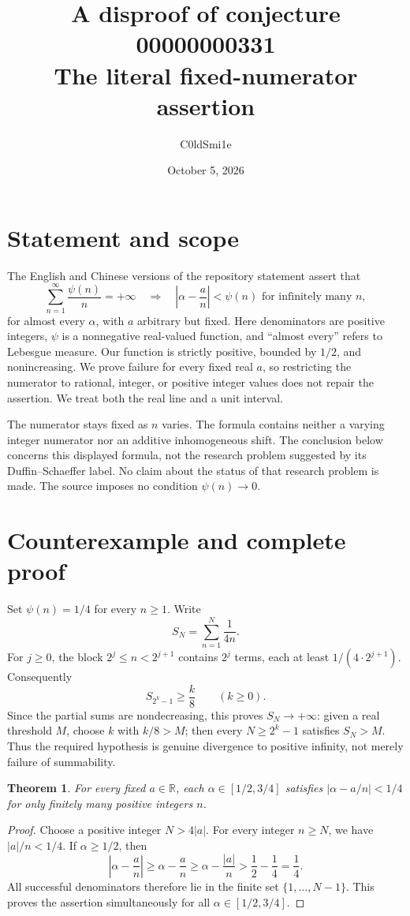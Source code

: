 \documentclass[11pt]{article}
\title{A disproof of conjecture 00000000331\\\large The literal fixed-numerator assertion}
\author{C0ldSmi1e}
\date{October 5, 2026}
\newtheorem{theorem}{Theorem}
\begin{document}
\maketitle

\section{Statement and scope}
The English and Chinese versions of the repository statement assert that
\[
 \sum_{n=1}^{\infty}\frac{\psi(n)}{n}=+\infty
 \quad\Longrightarrow\quad
 \left|\alpha-\frac{a}{n}\right|<\psi(n)
 \text{ for infinitely many }n,
\]
for almost every $\alpha$, with $a$ arbitrary but fixed. Here denominators
are positive integers, $\psi$ is a nonnegative real-valued function, and
``almost every'' refers to Lebesgue measure. Our function is strictly positive,
bounded by $1/2$, and nonincreasing. We prove failure for every fixed real $a$,
so restricting the numerator to rational, integer, or positive integer values
does not repair the assertion. We treat both the real line and a unit interval.

The numerator stays fixed as $n$ varies. The formula contains neither a varying
integer numerator nor an additive inhomogeneous shift. The conclusion below
concerns this displayed formula, not the research problem suggested by its
Duffin--Schaeffer label. No claim about the status of that research problem
is made. The source imposes no condition $\psi(n)\to0$.

\section{Counterexample and complete proof}
Set $\psi(n)=1/4$ for every $n\geq1$. Write
\[
 S_N=\sum_{n=1}^{N}\frac{1}{4n}.
\]
For $j\geq0$, the block $2^j\leq n<2^{j+1}$ contains $2^j$ terms, each at
least $1/(4\cdot2^{j+1})$. Consequently
\[
 S_{2^k-1}\geq \frac{k}{8}\qquad(k\geq0).
\]
Since the partial sums are nondecreasing, this proves $S_N\to+\infty$:
given a real threshold $M$, choose $k$ with $k/8>M$; then every
$N\geq2^k-1$ satisfies $S_N>M$. Thus the required hypothesis is genuine
divergence to positive infinity, not merely failure of summability.

\begin{theorem}
For every fixed $a\in\mathbb R$, each $\alpha\in[1/2,3/4]$ satisfies
$|\alpha-a/n|<1/4$ for only finitely many positive integers $n$.
\end{theorem}
\begin{proof}
Choose a positive integer $N>4|a|$. For every integer $n\geq N$, we have
$|a|/n<1/4$. If $\alpha\geq1/2$, then
\[
 \left|\alpha-\frac an\right|
 \geq \alpha-\frac an
 \geq \alpha-\frac{|a|}{n}
 > \frac12-\frac14=\frac14.
\]
All successful denominators therefore lie in the finite set
$\{1,\ldots,N-1\}$. This proves the assertion simultaneously for all
$\alpha\in[1/2,3/4]$.
\end{proof}
\end{document}
